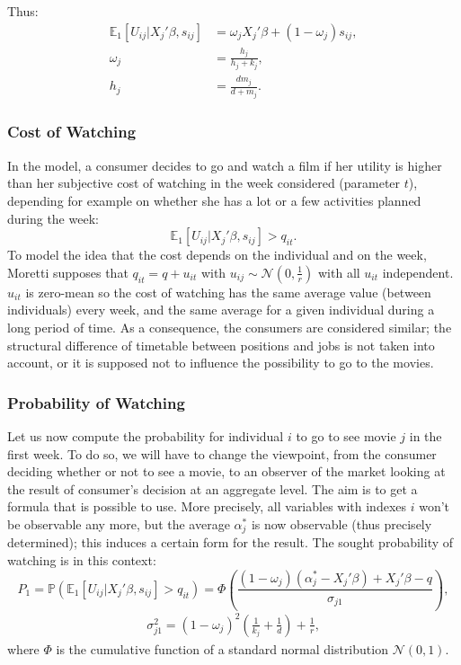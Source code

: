 	Thus:
	\begin{align*}
		\mathbb{E}_1[U_{i j}|X_{j}'\beta, s_{i j}]&=\omega_{j} X_{j}'\beta+(1-\omega_{j})s_{i j},\\
		\omega_j&=\frac{h_{j}}{h_{j}+k_{j}},\\ 
		h_{j}&=\frac{d m_{j}}{d+m_{j}}.
	\end{align*}
	
	\subsubsection{Cost of Watching}
	In the model, a consumer decides to go and watch a film if her utility is higher than her subjective cost of watching in the week considered (parameter $t$), depending for example on whether she has a lot or a few activities planned during the week: 
	\begin{equation}
	\mathbb{E}_1[U_{i j}|X_{j}'\beta, s_{i j}]>q_{i t}.
	\end{equation}
	To model the idea that the cost depends on the individual and on the week, Moretti supposes that $q_{i t}=q+u_{i t}$ with $u_{i j}\sim \mathcal{N}(0,\frac{1}{r})$ with all $u_{i t}$ independent. $u_{i t}$ is zero-mean so the cost of watching has the same average value (between individuals) every week, and the same average for a given individual during a long period of time. As a consequence, the consumers are considered similar; the structural difference of timetable between positions and jobs is not taken into account, or it is supposed not to influence the possibility to go to the movies.
	
	\subsubsection{Probability of Watching}
	Let us now compute the probability for individual $i$ to go to see movie $j$ in the first week. To do so, we will have to change the viewpoint, from the consumer deciding whether or not to see a movie, to an observer of the market looking at the result of consumer's decision at an aggregate level. The aim is to get a formula that is possible to use. More precisely, all variables with indexes $i$ won't be observable any more, but the average $\alpha_{j}^{*}$ is now observable (thus precisely determined); this induces a certain form for the result. The sought probability of watching is in this context:
	\begin{equation} \label{eq:4}
	P_{1}=\mathbb{P}(\mathbb{E}_1[U_{i j}|X_{j}'\beta, s_{i j}]>q_{i t})=\Phi\left(\frac{(1-\omega_{j})(\alpha_{j}^{*}-X_{j}'\beta)+X_{j}'\beta-q}{\sigma_{j 1}}\right),
	\end{equation}
	\begin{align*}
	\sigma_{j 1}^{2}=(1-\omega_{j})^{2}\left(\frac{1}{k_{j}}+\frac{1}{d}\right)+\frac{1}{r},
	\end{align*}
	where $\Phi$ is the cumulative function of a standard normal distribution $\mathcal{N}(0,1)$.

